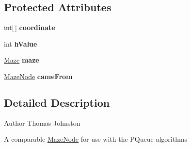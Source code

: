 \subsection*{Protected Attributes}
\begin{DoxyCompactItemize}
\item 
\hypertarget{classcs242_1_1johnst26_1_1maze_solver_1_1impl_1_1pqueue_1_1_maze_node_aa71362b2bcb7d5a8105f027fd6f2d9e0}{int\mbox{[}$\,$\mbox{]} {\bfseries coordinate}}\label{classcs242_1_1johnst26_1_1maze_solver_1_1impl_1_1pqueue_1_1_maze_node_aa71362b2bcb7d5a8105f027fd6f2d9e0}

\item 
\hypertarget{classcs242_1_1johnst26_1_1maze_solver_1_1impl_1_1pqueue_1_1_maze_node_ad1ba2b29775ae302f1b893c4284570ea}{int {\bfseries h\-Value}}\label{classcs242_1_1johnst26_1_1maze_solver_1_1impl_1_1pqueue_1_1_maze_node_ad1ba2b29775ae302f1b893c4284570ea}

\item 
\hypertarget{classcs242_1_1johnst26_1_1maze_solver_1_1impl_1_1pqueue_1_1_maze_node_a8401365e275725f297cd024065948b40}{\hyperlink{interfacecs242_1_1johnst26_1_1maze_1_1_maze}{Maze} {\bfseries maze}}\label{classcs242_1_1johnst26_1_1maze_solver_1_1impl_1_1pqueue_1_1_maze_node_a8401365e275725f297cd024065948b40}

\item 
\hypertarget{classcs242_1_1johnst26_1_1maze_solver_1_1impl_1_1pqueue_1_1_maze_node_a668932e98ec9104f28be79c8fbb84eb6}{\hyperlink{classcs242_1_1johnst26_1_1maze_solver_1_1impl_1_1pqueue_1_1_maze_node}{Maze\-Node} {\bfseries came\-From}}\label{classcs242_1_1johnst26_1_1maze_solver_1_1impl_1_1pqueue_1_1_maze_node_a668932e98ec9104f28be79c8fbb84eb6}

\end{DoxyCompactItemize}


\subsection{Detailed Description}
\begin{DoxyAuthor}{Author}
Thomas Johnston
\end{DoxyAuthor}
A comparable \hyperlink{classcs242_1_1johnst26_1_1maze_solver_1_1impl_1_1pqueue_1_1_maze_node}{Maze\-Node} for use with the P\-Queue algorithms 


